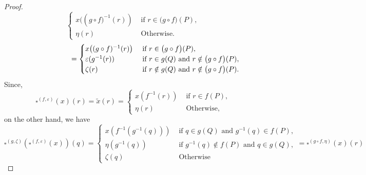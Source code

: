 \documentclass[11pt,a4paper,oldfontcommands]{memoir}
\newcommand*\exec{%
  \raisebox{1pt}{%
    \begin{tikzpicture}[x=.8ex,y=1ex,-]
      \draw (0,0) -- (1,0) -- (1,1) -- (2,1);
    \end{tikzpicture}}}
\begin{document}
\begin{proof}
\begin{equation*}
     \begin{cases} x\bigl((g\circ f\bigl)^{-1}(r)) & \text { if } r \in \bigl( g\circ f \bigl)(P), \\ \eta(r) & \text { Otherwise}. \end{cases}
     \end{equation*}
     \begin{equation*}
          \hspace{2.2cm}  = \begin{cases} x\bigl((g\circ f)^{-1}(r) \bigl) & \text { if }r \in \bigl( g\circ f \bigl)(P), \\  \varepsilon(g^{-1}(r)) & \text { if } r\in g(Q) \text{ and } r \notin \bigl( g\circ f \bigl)(P),\\ \zeta(r) & \text { if } r \notin g(Q) \text{ and } r \notin \bigl( g\circ f \bigl)(P). \end{cases}
    \end{equation*}
 Since,
\begin{equation*}
      \square^{(f,\varepsilon)}(x)(r)=
     \tilde{x}(r)= \begin{cases} x(f^{-1}(r)) & \text { if } r \in f(P), \\ \eta(r) & \text { Otherwise}, \end{cases}
    \end{equation*}
on the other hand, we have
\begin{equation*}
     \square^{(g,\zeta)}( \square^{(f,\varepsilon)}(x))(q)=
  \begin{cases}  x(f^{-1}(g^{-1}(q))) & \text { if } q \in g(Q) \text{ and } g^{-1}(q) \in f(P), \\ \eta(g^{-1}(q)) & \text { if } g^{-1}(q) \notin f(P) \text{ and } q \in g(Q), \\ \zeta(q) & \text { Otherwise} \end{cases}= \square^{(g\circ f,\eta)}(x)(r)
    \end{equation*}
\end{proof}
\end{document}
